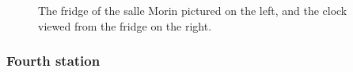 \documentclass[12pt,twoside,maitrise]{dms_ks}
\theoremstyle{definition}
\begin{document}
\begin{figure}[h]
    \centering
    \caption{The fridge of the salle Morin pictured on the left, and the clock viewed from the fridge on the right.}
    \label{fig:sidebyside}
\end{figure}

\subsubsection{Fourth station}
\end{document}

